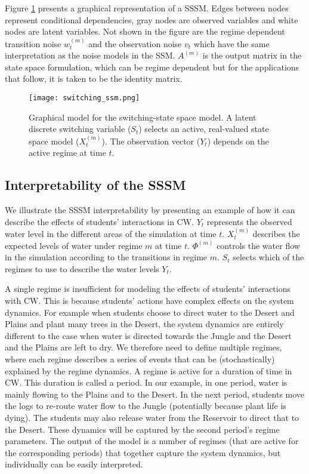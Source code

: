 Figure \ref{fig:switching_ssm} presents a graphical representation of a SSSM. Edges between nodes represent conditional dependencies, gray nodes are observed variables and white nodes are latent variables. Not shown in the figure are the regime dependent transition noise $w_t^{(m)}$ and the observation noise $v_t$ which have the same interpretation as the noise models in the SSM. $A^{(m)}$ is the output matrix in the state space formulation, which can be regime dependent but for the applications that follow, it is taken to be the identity matrix.

\begin{figure}
  \centering
  \texttt{[image: switching\_ssm.png]}
  \caption{Graphical model for the switching-state space model. A latent discrete switching variable ($S_t$) selects an active, real-valued state space model ($X^{(m)}_t$). The observation vector ($Y_t$)  depends on the active regime at time $t$.}
  \label{fig:switching_ssm}
\end{figure}

\subsection{Interpretability of the SSSM}\label{sec:interpretability_of_ssm}
We illustrate the SSSM interpretability by presenting an example of how it can describe the effects of students' interactions in CW. $Y_t$ represents the observed water level in the different areas of the simulation at time $t$. $X_t^{(m)}$ describes the expected levels of water under regime $m$ at time $t$. $\Phi^{(m)}$ controls the water flow in the simulation according to the transitions in regime $m$. $S_t$ selects which of the regimes to use to describe the water levels $Y_t$.

A single regime is insufficient for modeling the effects of students' interactions with CW. This is because students' actions have complex effects on the system dynamics. For example when students choose to direct water to the Desert and Plains and plant many trees in the Desert, the system dynamics are entirely different to the case when water is directed towards the Jungle and the Desert and the Plains are left to dry. We therefore need to define multiple regimes, where each regime describes a series of events that can be (stochastically) explained by the regime dynamics. A regime is active for a duration of time in CW. This duration is called a period. In our example, in one period, water is mainly flowing to the Plains and to the Desert. In the next period, students move the logs to re-route water flow to the Jungle (potentially because plant life is dying). The students may also release water from the Reservoir to direct that to the Desert. These dynamics will be captured by the second period's regime parameters. The output of the model is a number of regimes (that are active for the corresponding periods) that together capture the system dynamics, but individually can be easily interpreted.


